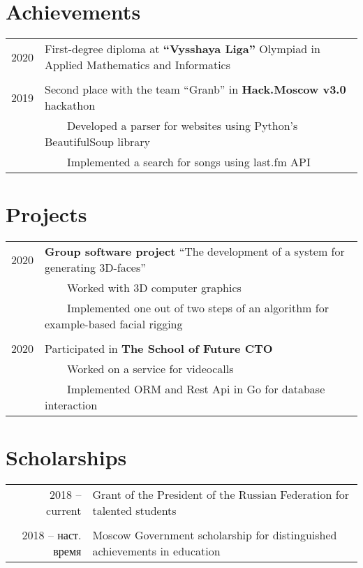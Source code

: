 \documentclass[a4paper,10pt]{article}
\newcommand{\tabitem}{~~\llap{\textbullet}~~}
\begin{document}
\section{Achievements}
\begin{tabular}{rl}
\hspace{0.9cm} 2020 & First-degree diploma at \textbf{``Vysshaya Liga''} Olympiad in Applied Mathematics and Informatics \\
&\\
\hspace{0.9cm} 2019 & Second place with the team “Granb” in \textbf{Hack.Moscow v3.0} hackathon \\
& \tabitem Developed a parser for websites using Python's BeautifulSoup library \\
& \tabitem Implemented a search for songs using last.fm API \\
\end{tabular}

\section{Projects}
\begin{tabular}{rl}
\hspace{0.9cm} 2020 & \textbf{Group software project} ``The development of a system for generating 3D-faces'' \\
& \tabitem Worked with 3D computer graphics \\
& \tabitem Implemented one out of two steps of an algorithm for example-based facial rigging\\
&\\
\hspace{0.9cm} 2020 & Participated in \textbf{The School of Future CTO} \\
& \tabitem Worked on a service for videocalls \\
& \tabitem Implemented ORM and Rest Api in Go for database interaction \\
\end{tabular}

\section{Scholarships}
\begin{tabular}{rl}
2018 -- current & Grant of the President of the Russian Federation for talented students \\
&\\
2018 -- наст. время & Moscow Government scholarship for distinguished achievements in education \\
\end{tabular}
\end{document}
